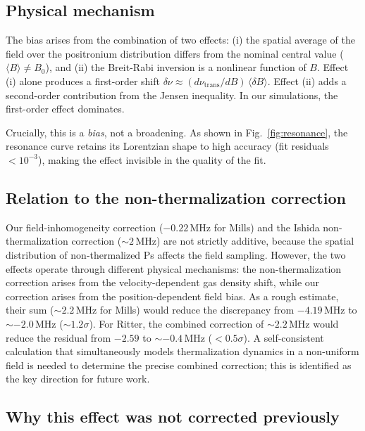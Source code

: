 \documentclass[twocolumn,pra,aps,superscriptaddress,floatfix,10pt]{revtex4-2}
\begin{document}
\subsection{Physical mechanism}

The bias arises from the combination of two effects: (i) the spatial average of the field over the positronium distribution differs from the nominal central value ($\langle B \rangle \neq B_0$), and (ii) the Breit-Rabi inversion is a nonlinear function of $B$. Effect (i) alone produces a first-order shift $\delta\nu \approx (d\nu_\mathrm{trans}/dB)\,\langle\delta B\rangle$. Effect (ii) adds a second-order contribution from the Jensen inequality. In our simulations, the first-order effect dominates.

Crucially, this is a \emph{bias}, not a broadening. As shown in Fig.~\ref{fig:resonance}, the resonance curve retains its Lorentzian shape to high accuracy (fit residuals $< 10^{-3}$), making the effect invisible in the quality of the fit.

\subsection{Relation to the non-thermalization correction}
\label{sec:thermalization}

Our field-inhomogeneity correction ($-0.22$\,MHz for Mills) and the Ishida non-thermalization correction ($\sim 2$\,MHz) are not strictly additive, because the spatial distribution of non-thermalized Ps affects the field sampling. However, the two effects operate through different physical mechanisms: the non-thermalization correction arises from the velocity-dependent gas density shift, while our correction arises from the position-dependent field bias. As a rough estimate, their sum ($\sim 2.2$\,MHz for Mills) would reduce the discrepancy from $-4.19$\,MHz to $\sim -2.0$\,MHz ($\sim 1.2\sigma$). For Ritter, the combined correction of $\sim 2.2$\,MHz would reduce the residual from $-2.59$ to $\sim -0.4$\,MHz ($< 0.5\sigma$). A self-consistent calculation that simultaneously models thermalization dynamics in a non-uniform field is needed to determine the precise combined correction; this is identified as the key direction for future work.

\subsection{Why this effect was not corrected previously}
\end{document}
